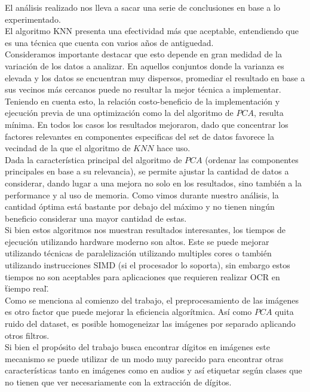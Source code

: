 El análisis realizado nos lleva a sacar una serie de conclusiones en base a lo experimentado.
\\
El algoritmo KNN presenta una efectividad más que aceptable, entendiendo que es una técnica que cuenta con varios años de antiguedad.
\\
Consideramos importante destacar que esto depende en gran medidad de la variación de los datos a analizar. En aquellos conjuntos donde la varianza es elevada y los datos se encuentran muy dispersos, promediar el resultado en base a sus vecinos más cercanos puede no resultar la mejor técnica a implementar.
\\
Teniendo en cuenta esto, la relación costo-beneficio de la implementación y ejecución previa de una optimización como la del algoritmo de $PCA$, resulta mínima. En todos los casos los resultados mejoraron, dado que concentrar los factores relevantes en componentes especificas del set de datos favorece la vecindad de la que el algoritmo de $KNN$ hace uso.
\\
Dada la característica principal del algoritmo de $PCA$ (ordenar las componentes principales en base a su relevancia), se permite ajustar la cantidad de datos a considerar, dando lugar a una mejora no solo en los resultados, sino también a la performance y al uso de memoria. Como vimos durante nuestro análisis, la cantidad óptima está bastante por debajo del máximo y no tienen ningún beneficio considerar una mayor cantidad de estas.
\\
Si bien estos algoritmos nos muestran resultados interesantes, los tiempos de ejecución utilizando hardware moderno son altos. Este se puede mejorar utilizando técnicas de paralelización utilizando multiples cores o también utilizando instrucciones SIMD (si el procesador lo soporta), sin embargo estos tiempos no son aceptables para aplicaciones que requieren realizar OCR en \"tiempo real\".
\\
Como se menciona al comienzo del trabajo, el preprocesamiento de las imágenes es otro factor que puede mejorar la eficiencia algorítmica. Así como $PCA$ quita ruido del dataset, es posible homogeneizar las imágenes por separado aplicando otros filtros.
\\
Si bien el propósito del trabajo busca encontrar dígitos en imágenes este mecanismo se puede utilizar de un modo muy parecido para encontrar otras características tanto en imágenes como en audios y así etiquetar según clases que no tienen que ver necesariamente con la extracción de dígitos. 
